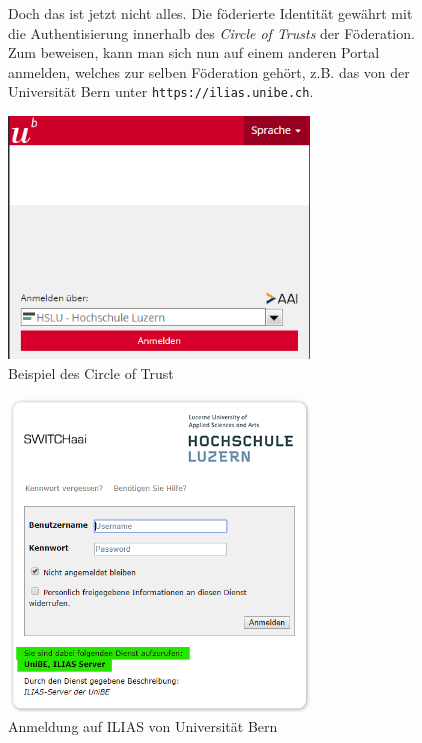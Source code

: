 \documentclass[10pt,a4paper]{article}
\begin{document}
\begin{figure}[H]
    Doch das ist jetzt nicht alles. Die föderierte Identität gewährt mit die Authentisierung innerhalb des \textsl{Circle of Trusts} der Föderation. Zum beweisen, kann man sich nun auf einem anderen Portal anmelden, welches zur selben Föderation gehört, z.B. das von der Universität Bern unter \texttt{https://ilias.unibe.ch}.
    \begin{center}
    \includegraphics[width=8cm]{images/switchaai4.png}
    \caption{Beispiel des Circle of Trust}
    \label{switchaai4}
    \end{center}
\end{figure}

\begin{figure}[H]
    \begin{center}
    \includegraphics[width=8cm]{images/switchaai5.png}
    \caption{Anmeldung auf ILIAS von Universität Bern}
    \label{switchai5}
    \end{center}
\end{figure}
\end{document}
